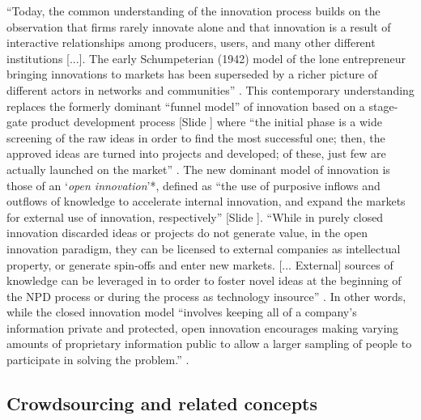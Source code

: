 \documentclass{article}
\newcounter{slide}
\begin{document}
``Today, the common understanding of the innovation process builds on the observation that firms rarely innovate alone and that innovation is a result of interactive relationships among producers, users, and many other different institutions [...]. The early Schumpeterian (1942) model of the lone entrepreneur bringing innovations to markets has been superseded by a richer picture of different actors in networks and communities'' \cite{pillerSocialMediaSocial2011}. This contemporary understanding replaces the formerly dominant ``funnel model'' of innovation based on a stage-gate product development process {\color{blue}[Slide ]} where ``the initial phase is a wide screening of the raw ideas in order to find the most successful one; then, the approved ideas are turned into projects and developed; of these, just few are actually launched on the market'' \cite{colomboOpenInnovationMeets2016}. The new dominant model of innovation is those of an `\emph{open innovation}'*, defined as ``the use of purposive inflows and outflows of knowledge to accelerate internal innovation, and expand the markets for external use of innovation, respectively'' \cite{chesbroughOpenInnovationNew2006}{\color{blue}[Slide ]}. ``While in purely closed innovation discarded ideas or projects do not generate value, in the open innovation paradigm, they can be licensed to external companies as intellectual property, or generate spin-offs and enter new markets. [... External] sources of knowledge can be leveraged in to order to foster novel ideas at the beginning of the NPD process or during the process as technology insource'' \cite{colomboOpenInnovationMeets2016}. In other words, while the closed innovation model ``involves keeping all of a company’s information private and protected, open innovation encourages making varying amounts of proprietary information public to allow a larger sampling of people to participate in solving the problem.'' \cite{petersonSocialProductDevelopment2014}. 

\subsection{Crowdsourcing and related concepts}
\label{sec:crowdsourcing}
\end{document}
